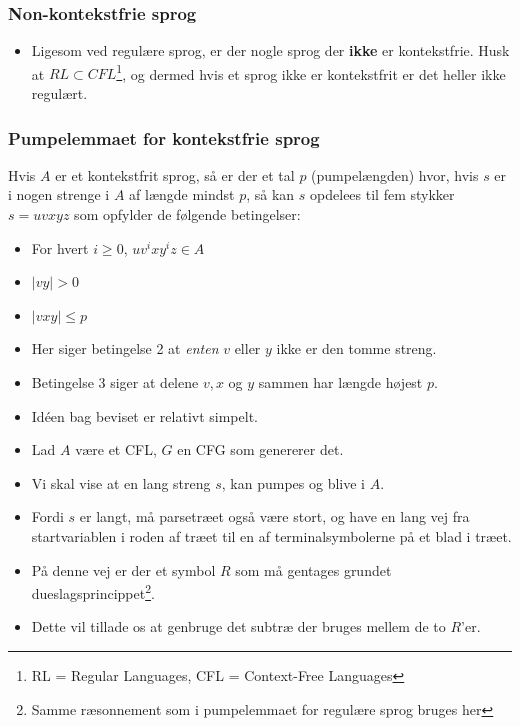 \begin{frame}
	\frametitle{Non-kontekstfrie sprog}
	\begin{itemize}
		\item Ligesom ved regulære sprog, er der nogle sprog der \textbf{ikke} er kontekstfrie. Husk at $RL \subset CFL$\footnote{RL = Regular Languages, CFL = Context-Free Languages}, og dermed hvis et sprog ikke er kontekstfrit er det heller ikke regulært.
	\end{itemize}
\end{frame}

\begin{frame}[allowframebreaks]
	\frametitle{Pumpelemmaet for kontekstfrie sprog}

	\begin{theorem}
		Hvis $A$ er et kontekstfrit sprog, så er der et tal $p$ (pumpelængden) hvor, hvis $s$ er i nogen strenge i $A$ af længde mindst $p$, så kan $s$ opdelees til fem stykker $s = uvxyz$ som opfylder de følgende betingelser:
		\begin{itemize}
			\item For hvert $i \ge 0$, $uv^{i}xy^{i}z \in A$
			\item $|vy| > 0$
			\item $|vxy| \le p$
		\end{itemize}
	\end{theorem}
	\begin{itemize}
		\item Her siger betingelse 2 at \textit{enten} $v$ eller $y$ ikke er den tomme streng.
		\item Betingelse 3 siger at delene $v, x$ og $y$ sammen har længde højest $p$.
		\item Idéen bag beviset er relativt simpelt.
		\item Lad $A$ være et CFL, $G$ en CFG som genererer det.
		\item Vi skal vise at en lang streng $s$, kan pumpes og blive i $A$.
		\item Fordi $s$ er langt, må parsetræet også være stort, og have en lang vej fra startvariablen i roden af træet til en af terminalsymbolerne på et blad i træet.
		\item På denne vej er der et symbol $R$ som må gentages grundet dueslagsprincippet\footnote{Samme ræsonnement som i pumpelemmaet for regulære sprog bruges her}.
		\item Dette vil tillade os at genbruge det subtræ der bruges mellem de to $R$'er.
	\end{itemize}

\end{frame}
